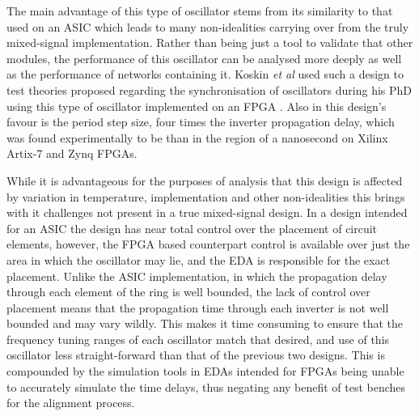 The main advantage of this type of oscillator stems from its similarity to that used on an \ac{ASIC} which leads to many non-idealities carrying over from the truly mixed-signal implementation. Rather than being just a tool to validate that other modules, the performance of this oscillator can be analysed more deeply as well as the performance of networks containing it. Koskin \textit{et al} used such a design to test theories proposed regarding the synchronisation of oscillators during his PhD using this type of oscillator implemented on an \ac{FPGA} \cite{koskin2019phd,theboys2019}. Also in this design's favour is the period step size, four times the inverter propagation delay, which was found experimentally to be than in the region of a nanosecond on Xilinx Artix-7 and Zynq \ac{FPGA}s.

While it is advantageous for the purposes of analysis that this design is affected by variation in temperature, implementation and other non-idealities this brings with it challenges not present in a true mixed-signal design. In a design intended for an \ac{ASIC} the design has near total control over the placement of circuit elements, however, the \ac{FPGA} based counterpart control is available over just the area in which the oscillator may lie, and the \ac{EDA} is responsible for the exact placement. Unlike the \ac{ASIC} implementation, in which the propagation delay through each element of the ring is well bounded, the lack of control over placement means that the propagation time through each inverter is not well bounded and may vary wildly. This makes it time consuming to ensure that the frequency tuning ranges of each oscillator match that desired, and use of this oscillator less straight-forward than that of the previous two designs. This is compounded by the simulation tools in \ac{EDA}s intended for \ac{FPGA}s being unable to accurately simulate the time delays, thus negating any benefit of test benches for the alignment process.

